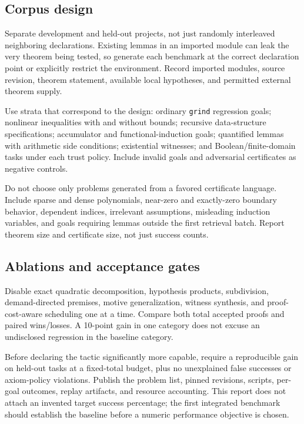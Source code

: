 \documentclass[11pt,letterpaper]{article}
\newcommand{\grind}{\texttt{grind}}
\theoremstyle{definition}
\theoremstyle{remark}
\begin{document}
\subsection{Corpus design}
Separate development and held-out projects, not just randomly interleaved neighboring declarations. Existing lemmas in an imported module can leak the very theorem being tested, so generate each benchmark at the correct declaration point or explicitly restrict the environment. Record imported modules, source revision, theorem statement, available local hypotheses, and permitted external theorem supply.

Use strata that correspond to the design: ordinary \grind{} regression goals; nonlinear inequalities with and without bounds; recursive data-structure specifications; accumulator and functional-induction goals; quantified lemmas with arithmetic side conditions; existential witnesses; and Boolean/finite-domain tasks under each trust policy. Include invalid goals and adversarial certificates as negative controls.

Do not choose only problems generated from a favored certificate language. Include sparse and dense polynomials, near-zero and exactly-zero boundary behavior, dependent indices, irrelevant assumptions, misleading induction variables, and goals requiring lemmas outside the first retrieval batch. Report theorem size and certificate size, not just success counts.

\subsection{Ablations and acceptance gates}
Disable exact quadratic decomposition, hypothesis products, subdivision, demand-directed premises, motive generalization, witness synthesis, and proof-cost-aware scheduling one at a time. Compare both total accepted proofs and paired wins/losses. A 10-point gain in one category does not excuse an undisclosed regression in the baseline category.

Before declaring the tactic significantly more capable, require a reproducible gain on held-out tasks at a fixed-total budget, plus no unexplained false successes or axiom-policy violations. Publish the problem list, pinned revisions, scripts, per-goal outcomes, replay artifacts, and resource accounting. This report does not attach an invented target success percentage; the first integrated benchmark should establish the baseline before a numeric performance objective is chosen.
\end{document}
